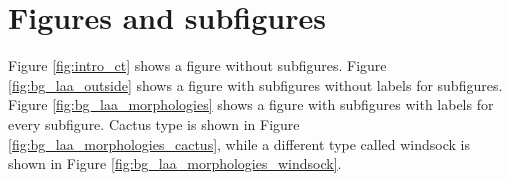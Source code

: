 \section{Figures and subfigures}
\label{sec:bg_anatomy_laa}
Figure \ref{fig:intro_ct} shows a figure without subfigures.
Figure \ref{fig:bg_laa_outside} shows a figure with subfigures without labels
for subfigures. Figure \ref{fig:bg_laa_morphologies} shows a figure with
subfigures with labels for every subfigure. Cactus type is shown in Figure
\ref{fig:bg_laa_morphologies_cactus}, while a different type called windsock is 
shown in Figure \ref{fig:bg_laa_morphologies_windsock}.

